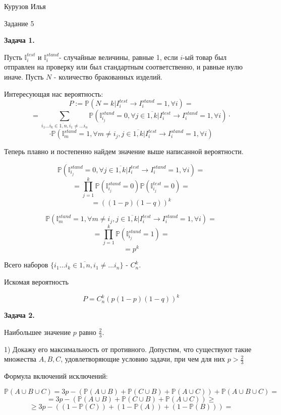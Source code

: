 \documentclass[12pt]{article}
\begin{document}
\begin{center}
{Курузов Илья}

{Задание 5}
\end{center}

\begin{center}
\textbf{Задача 1.}
\end{center}

Пусть $\mathbb{I}_i^{test}$ и $\mathbb{I}_i^{stand}$- случайные величины, равные 1, если $i$-ый товар был отправлен на проверку или был стандартным соответственно, и равные нулю иначе. Пусть $N$ - количество бракованных изделий.

Интересующая нас вероятность:
$$P := \mathbb{P}(N = k|I_i^{test}\to I_i^{stand} = 1, \forall i) = $$
$$ =\sum\limits_{i_1\dots i_k \in \overline{1, n}, i_1\neq\dots i_n}  \mathbb{P}(\mathbb{I}_{i_j}^{stand} = 0, \forall j \in \overline{1, k}|I_i^{test}\to I_i^{stand} = 1, \forall i) \cdot $$
$$\cdot \mathbb{P}(\mathbb{I}_{m}^{stand} = 1, \forall m \neq i_j, j \in \overline{1, k}|I_i^{test}\to I_i^{stand} = 1, \forall i)$$  

Теперь плавно и постепенно найдем значение выше написанной вероятности.

$$\mathbb{P}(\mathbb{I}_{i_j}^{stand} = 0, \forall j \in \overline{1, k}|I_i^{test}\to I_i^{stand} = 1, \forall i) = $$
$$= \prod_{j = 1}^k \mathbb{P}(\mathbb{I}_{i_j}^{stand} = 0)\mathbb{P}(\mathbb{I}_{i_j}^{test} = 0)=$$
$$= \left((1-p)(1-q)\right)^k$$


$$\mathbb{P}(\mathbb{I}_{m}^{stand} = 1, \forall m \neq i_j, j \in \overline{1, k}|I_i^{test}\to I_i^{stand} = 1, \forall i) = $$
$$= \prod_{j = 1}^k \mathbb{P}(\mathbb{I}_{i_j}^{stand} = 1)= $$ 
$$ = p^k$$ 

Всего наборов $\{i_1\dots i_k \in \overline{1, n}, i_1\neq\dots i_n\}$ - $C_n^k$.

Искомая вероятность

$$\boxed{P = C_n^k \left(p(1-p)(1-q)\right)^k}$$
\begin{center}
\textbf{Задача 2.}
\end{center}

Наибольшее значение $p$ равно $\frac{2}{3}$.

1) Докажу его максимальность от противного. Допустим, что существуют  такие множества $A, B, C$, удовлетворяющие условию задачи, при чем для них $p >\frac{2}{3}$

Формула включений исключений:

$$\mathbb{P}(A \cup B\cup C) = 3p - \left(\mathbb{P}(A\cup B)+\mathbb{P}(C\cup B)+\mathbb{P}(A\cup C)\right) + \mathbb{P}(A\cup B \cup C)=$$
$$= 3p - \left(\mathbb{P}(A\cup B)+\mathbb{P}(C\cup B)+\mathbb{P}(A\cup C)\right) \geq$$
$$\geq 3p - \left((1 - \mathbb{P}(C)) + (1 - \mathbb{P}(A)) + (1 - \mathbb{P}(B))\right) = $$
\end{document}
